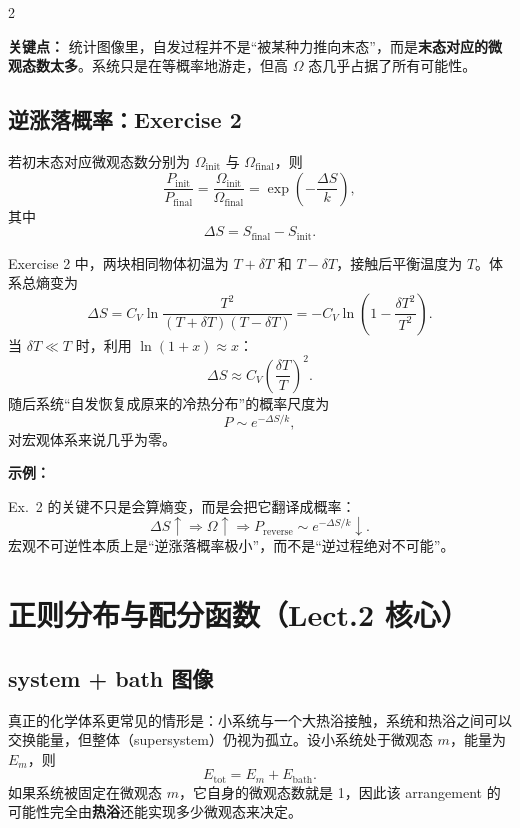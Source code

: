 \documentclass[a4paper,9pt]{article}
\newenvironment{keypoint}
{\par\vspace{0.3em}\noindent\begin{tcolorbox}[
  colback=keybg,
  colframe=keycolor,
  boxrule=0.5pt,
  arc=2pt,
  left=2pt,
  right=2pt,
  top=2pt,
  bottom=2pt,
  boxsep=0pt,
  ]
\noindent\textcolor{keycolor}{\textbf{关键点：}}}
{\end{tcolorbox}\par\vspace{0.3em}}
\newenvironment{examplebox}
{\par\vspace{0.3em}\noindent\begin{tcolorbox}[
  colback=boxbg,
  colframe=derivcolor,
  boxrule=0.5pt,
  arc=2pt,
  left=2pt,
  right=2pt,
  top=2pt,
  bottom=2pt,
  boxsep=0pt,
  ]
\scriptsize\noindent\textcolor{derivcolor}{\textbf{示例：}}\par
\setlength{\parskip}{0.1ex}\setlength{\itemsep}{0pt}\setlength{\parsep}{0pt}}
{\end{tcolorbox}\par\vspace{0.3em}}
\begin{document}
\begin{multicols}{2}
	\begin{keypoint}
		统计图像里，自发过程并不是“被某种力推向末态”，而是\textbf{末态对应的微观态数太多}。系统只是在等概率地游走，但高 $\Omega$ 态几乎占据了所有可能性。
	\end{keypoint}

	\subsection{逆涨落概率：Exercise 2}
	若初末态对应微观态数分别为 $\Omega_{\mathrm{init}}$ 与 $\Omega_{\mathrm{final}}$，则
	\[
		\frac{P_{\mathrm{init}}}{P_{\mathrm{final}}}=\frac{\Omega_{\mathrm{init}}}{\Omega_{\mathrm{final}}}
		=\exp\!\left(-\frac{\Delta S}{k}\right),
	\]
	其中
	\[
		\Delta S=S_{\mathrm{final}}-S_{\mathrm{init}}.
	\]

	Exercise 2 中，两块相同物体初温为 $T+\delta T$ 和 $T-\delta T$，接触后平衡温度为 $T$。体系总熵变为
	\[
		\Delta S=C_V\ln\frac{T^2}{(T+\delta T)(T-\delta T)}
		=-C_V\ln\left(1-\frac{\delta T^2}{T^2}\right).
	\]
	当 $\delta T\ll T$ 时，利用 $\ln(1+x)\approx x$：
	\[
		\Delta S\approx C_V\left(\frac{\delta T}{T}\right)^2.
	\]
	随后系统“自发恢复成原来的冷热分布”的概率尺度为
	\[
		P\sim e^{-\Delta S/k},
	\]
	对宏观体系来说几乎为零。

	\begin{examplebox}
		Ex.~2 的关键不只是会算熵变，而是会把它翻译成概率：
		\[
			\Delta S\uparrow \Rightarrow \Omega\uparrow \Rightarrow P_{\text{reverse}}\sim e^{-\Delta S/k}\downarrow.
		\]
		宏观不可逆性本质上是“逆涨落概率极小”，而不是“逆过程绝对不可能”。
	\end{examplebox}

	\section{正则分布与配分函数（Lect.2 核心）}

	\subsection{system + bath 图像}
	真正的化学体系更常见的情形是：小系统与一个大热浴接触，系统和热浴之间可以交换能量，但整体（supersystem）仍视为孤立。设小系统处于微观态 $m$，能量为 $E_m$，则
	\[
		E_{\mathrm{tot}}=E_m+E_{\mathrm{bath}}.
	\]
	如果系统被固定在微观态 $m$，它自身的微观态数就是 1，因此该 arrangement 的可能性完全由\textbf{热浴}还能实现多少微观态来决定。


\end{multicols}
\end{document}
